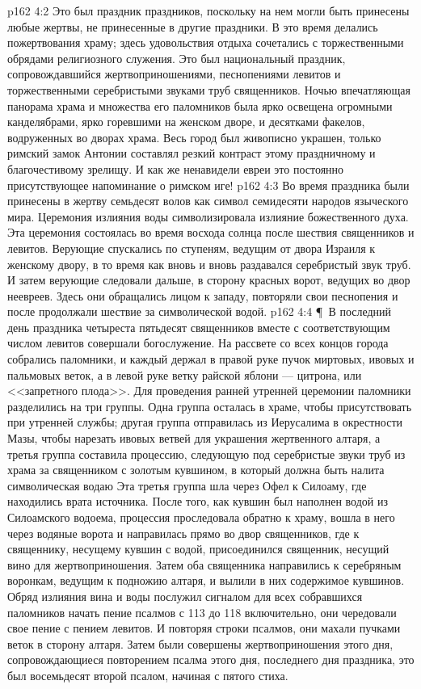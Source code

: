 \vs p162 4:2 Это был праздник праздников, поскольку на нем могли быть принесены любые жертвы, не принесенные в другие праздники. В это время делались пожертвования храму; здесь удовольствия отдыха сочетались с торжественными обрядами религиозного служения. Это был национальный праздник, сопровождавшийся жертвоприношениями, песнопениями левитов и торжественными серебристыми звуками труб священников. Ночью впечатляющая панорама храма и множества его паломников была ярко освещена огромными канделябрами, ярко горевшими на женском дворе, и десятками факелов, водруженных во дворах храма. Весь город был живописно украшен, только римский замок Антонии составлял резкий контраст этому праздничному и благочестивому зрелищу. И как же ненавидели евреи это постоянно присутствующее напоминание о римском иге!
\vs p162 4:3 Во время праздника были принесены в жертву семьдесят волов как символ семидесяти народов языческого мира. Церемония излияния воды символизировала излияние божественного духа. Эта церемония состоялась во время восхода солнца после шествия священников и левитов. Верующие спускались по ступеням, ведущим от двора Израиля к женскому двору, в то время как вновь и вновь раздавался серебристый звук труб. И затем верующие следовали дальше, в сторону красных ворот, ведущих во двор неевреев. Здесь они обращались лицом к западу, повторяли свои песнопения и после продолжали шествие за символической водой.
\vs p162 4:4 \P\ В последний день праздника четыреста пятьдесят священников вместе с соответствующим числом левитов совершали богослужение. На рассвете со всех концов города собрались паломники, и каждый держал в правой руке пучок миртовых, ивовых и пальмовых веток, а в левой руке ветку райской яблони --- цитрона, или <<запретного плода>>. Для проведения ранней утренней церемонии паломники разделились на три группы. Одна группа осталась в храме, чтобы присутствовать при утренней службы; другая группа отправилась из Иерусалима в окрестности Мазы, чтобы нарезать ивовых ветвей для украшения жертвенного алтаря, а третья группа составила процессию, следующую под серебристые звуки труб из храма за священником с золотым кувшином, в который должна быть налита символическая водаю Эта третья группа шла через Офел к Силоаму, где находились врата источника. После того, как кувшин был наполнен водой из Силоамского водоема, процессия проследовала обратно к храму, вошла в него через водяные ворота и направилась прямо во двор священников, где к священнику, несущему кувшин с водой, присоединился священник, несущий вино для жертвоприношения. Затем оба священника направились к серебряным воронкам, ведущим к подножию алтаря, и вылили в них содержимое кувшинов. Обряд излияния вина и воды послужил сигналом для всех собравшихся паломников начать пение псалмов с 113 до 118 включительно, они чередовали свое пение с пением левитов. И повторяя строки псалмов, они махали пучками веток в сторону алтаря. Затем были совершены жертвоприношения этого дня, сопровождающиеся повторением псалма этого дня, последнего дня праздника, это был восемьдесят второй псалом, начиная с пятого стиха.
